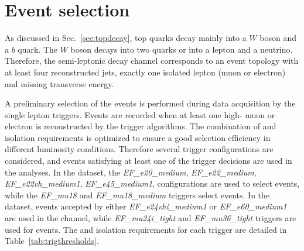 \section{Event selection}
\label{sec:evtsel}

As discussed in Sec.~\ref{sec:topdecay}, top quarks
decay mainly into a $W$ boson and a $b$ quark. The $W$ boson decays
into two quarks or into a lepton and a neutrino. Therefore, the
semi-leptonic decay channel corresponds to an event topology with at
least four reconstructed jets, exactly one isolated lepton (muon or
electron) and missing transverse energy.

A preliminary selection of the events is performed during data
acquisition by the single lepton triggers. Events are recorded when at
least one high-\pt{} muon or electron is reconstructed by the trigger
algorithms. 
The combination of \pt{} and isolation requirements is optimized to ensure
a good selection efficiency in different luminosity
conditions. Therefore several trigger configurations are
considered, and events satisfying at least one of the trigger
decisions are used in the analyses.
In the \seventev{} dataset, the {\it EF\_e20\_medium}, {\it
  EF\_e22\_medium}, {\it EF\_e22vh\_medium1}, {\it EF\_e45\_medium1},
configurations are used to select \ejets{} events, while the {\it
  EF\_mu18} and {\it EF\_mu18\_medium} triggers select \mujets{}
events. In the \eighttev{} dataset, events accepted by either {\it
  EF\_e24vhi\_medium1} or {\it EF\_e60\_medium1} are used in the
\ejets{} channel, while {\it EF\_mu24i\_tight} and {\it
  EF\_mu36\_tight} triggers are used for \mujets{} events.
The \pt{} and isolation requirements for each trigger are detailed in
Table~\ref{tab:trigthresholds}.

